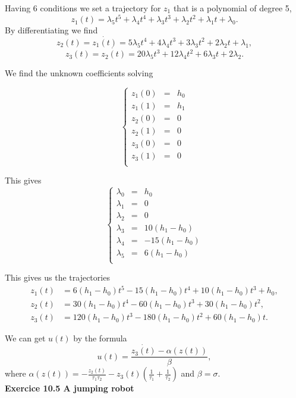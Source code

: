 Having $6$ conditions we set a trajectory for $z_{1}$ that is a polynomial of degree 5, 
$$z_{1}(t)=\lambda_{5} t^{5}+\lambda_{4} t^{4} + \lambda_{3} t^{3} + \lambda_{2} t^{2} +\lambda_{1} t+\lambda_{0}.$$
By differentiating we find
$$z_{2}(t)=\dot{z_{1}(t)}=5\lambda_{5} t^{4}+4\lambda_{4} t^{3} + 3\lambda_{3} t^{2} + 2\lambda_{2} t +\lambda_{1},$$
$$z_{3}(t)=\dot{z_{2}(t)}=20\lambda_{5} t^{3}+12\lambda_{4} t^{2} + 6\lambda_{3} t + 2\lambda_{2}.$$

We find the unknown coefficients solving

$$\left\{\begin{array}{ccc}
z_{1}(0) & = & h_{0}\\
z_{1}(1) & = & h_{1}\\
z_{2}(0) & = & 0\\
z_{2}(1) & = & 0\\
z_{3}(0) & = & 0\\
z_{3}(1) & = & 0\\
\end{array}\right.$$

This gives 
$$\left\{\begin{array}{ccc}
\lambda_{0} & = & h_{0}\\
\lambda_{1} & = & 0\\
\lambda_{2} & = & 0\\
\lambda_{3}& = & 10(h_{1}-h_{0})\\
\lambda_{4}& = & -15(h_{1}-h_{0})\\
\lambda_{5}& = & 6(h_{1}-h_{0})\\
\end{array}\right.$$



This gives us the trajectories
\begin{align*}
z_{1}(t)&=6(h_{1}-h_{0}) t^{5}-15(h_{1}-h_{0}) t^{4} + 10(h_{1}-h_{0}) t^{3} + h_{0},\\
z_{2}(t)&=30(h_{1}-h_{0}) t^{4}-60(h_{1}-h_{0}) t^{3} + 30(h_{1}-h_{0}) t^{2},\\
z_{3}(t)&=120(h_{1}-h_{0}) t^{3}-180(h_{1}-h_{0}) t^{2} + 60(h_{1}-h_{0}) t.
\end{align*}


We can get $u(t)$ by the formula
$$u(t)=\dfrac{\dot{z_{3}(t)}-\alpha(z(t))}{\beta},$$
where $\alpha(z(t))=-\frac{z_{2}(t)}{\tau_{1}\tau_{2}}-z_{3}(t)(\frac{1}{\tau_{1}}+\frac{1}{\tau_{2}})$ and $\beta=\sigma$.\\


\textbf{Exercice 10.5 A jumping robot}\\


